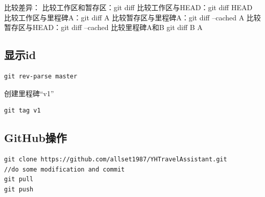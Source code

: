 比较差异：
比较工作区和暂存区：git diff
比较工作区与HEAD：git diff HEAD
比较工作区与里程碑A：git diff A
比较暂存区与里程碑A：git diff --cached A
比较暂存区与HEAD：git diff --cached
比较里程碑A和B git diff B A

\subsection{显示id}
\begin{verbatim}
git rev-parse master
\end{verbatim}

创建里程碑``v1''
\begin{verbatim}
git tag v1
\end{verbatim}

\subsection{GitHub操作}
\begin{verbatim}
git clone https://github.com/allset1987/YHTravelAssistant.git
//do some modification and commit
git pull
git push
\end{verbatim}


